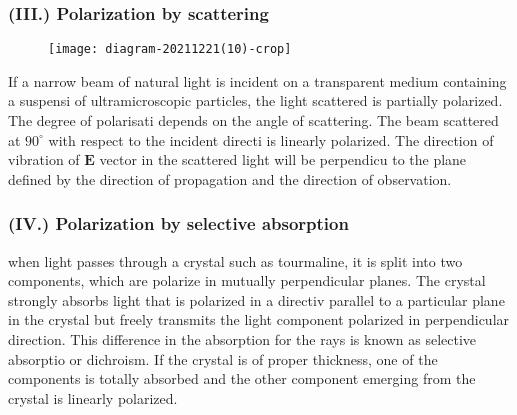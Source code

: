        \subsubsection{(III.) Polarization by scattering}
      \begin{figure}[H]
      	\centering
      	\texttt{[image: diagram-20211221(10)-crop]}
      	\caption{}
      	\label{}
      \end{figure}
      If a narrow beam of natural light is incident on a transparent medium containing a suspensi of ultramicroscopic particles, the light scattered is partially polarized. The degree of polarisati depends on the angle of scattering. The beam scattered at $90^{\circ}$ with respect to the incident directi is linearly polarized. The direction of vibration of $\mathbf{E}$ vector in the scattered light will be perpendicu to the plane defined by the direction of propagation and the direction of observation.
     \subsubsection{(IV.) Polarization by selective absorption}
     when  light passes through a crystal such as tourmaline, it is split into two components, which are polarize in mutually perpendicular planes. The crystal strongly absorbs light that is polarized in a directiv parallel to a particular plane in the crystal but freely transmits the light component polarized in perpendicular direction. This difference in the absorption for the rays is known as selective absorptio or dichroism. If the crystal is of proper thickness, one of the components is totally absorbed and the other component emerging from the crystal is linearly polarized. 
